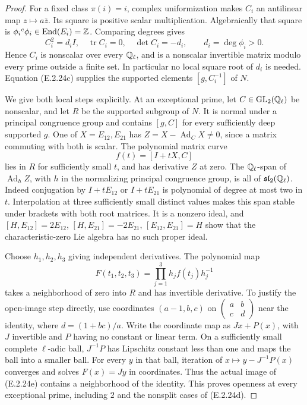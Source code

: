 \begin{proof}
For a fixed class \(\pi(i)=i\), complex uniformization
makes \(C_i\) an antilinear map \(z\mapsto a\bar z\).
Its square is positive scalar multiplication. Algebraically
that square is \(\phi_i{}^c\phi_i\in\operatorname{End}(E_i)=\mathbb Z\).
Comparing degrees gives
\[
 C_i^2=d_iI,\quad \operatorname{tr}C_i=0,\quad
 \det C_i=-d_i,\qquad d_i=\deg\phi_i>0.
 \tag{E.2.24d}
\]
Hence \(C_i\) is nonscalar over every \(\mathbb Q_\ell\), and
is a nonscalar invertible matrix modulo every prime
outside a finite set. In particular no local square root
of \(d_i\) is needed. Equation (E.2.24c) supplies the
supported elements \([g,C_i^{-1}]\) of \(N\).

We give both local steps explicitly. At an exceptional prime,
let \(C\in\operatorname{GL}_2(\mathbb Q_\ell)\) be nonscalar, and let \(R\)
be the supported subgroup of \(N\). It is normal under a
principal congruence group and contains \([g,C]\) for every
sufficiently deep supported \(g\). One of
\(X=E_{12},E_{21}\) has
\(Z=X-\operatorname{Ad}_C X\ne0\), since a matrix
commuting with both is scalar. The polynomial matrix curve
\[
 f(t)=[I+tX,C]
\]
lies in \(R\) for sufficiently small \(t\), and has
derivative \(Z\) at zero. The \(\mathbb Q_\ell\)-span of
\(\operatorname{Ad}_hZ\), with \(h\) in the normalizing
principal congruence group, is all of
\(\mathfrak{sl}_2(\mathbb Q_\ell)\). Indeed conjugation by
\(I+tE_{12}\) or \(I+tE_{21}\) is polynomial of degree
at most two in \(t\). Interpolation at three sufficiently
small distinct values makes this span stable under brackets
with both root matrices. It is a nonzero ideal, and
\([H,E_{12}]=2E_{12}\), \([H,E_{21}]=-2E_{21}\),
\([E_{12},E_{21}]=H\) show that the characteristic-zero
Lie algebra has no such proper ideal.

Choose \(h_1,h_2,h_3\) giving independent derivatives.
The polynomial map
\[
 F(t_1,t_2,t_3)=\prod_{j=1}^3h_jf(t_j)h_j^{-1}
 \tag{E.2.24e}
\]
takes a neighborhood of zero into \(R\) and has invertible
derivative. To justify the open-image step directly, use
coordinates \((a-1,b,c)\) on
\(\left(\begin{smallmatrix}a&b\\c&d\end{smallmatrix}\right)\)
near the identity, where \(d=(1+bc)/a\).
Write the coordinate map as \(Jx+P(x)\), with \(J\)
invertible and \(P\) having no constant or linear term.
On a sufficiently small complete \(\ell\)-adic ball,
\(J^{-1}P\) has Lipschitz constant less than one and
maps the ball into a smaller ball. For every \(y\) in
that ball, iteration of
\(x\mapsto y-J^{-1}P(x)\) converges and solves
\(F(x)=Jy\) in coordinates. Thus the actual image of
(E.2.24e) contains a neighborhood of the identity.
This proves openness at every exceptional prime, including
\(2\) and the nonsplit cases of (E.2.24d).


\end{proof}
